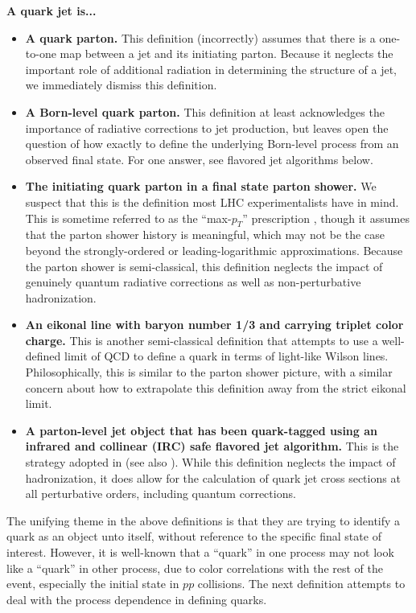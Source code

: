 \documentclass[11pt]{cernrep}
\begin{document}
\noindent \textbf{A quark jet is...}
\begin{itemize}
\item \textbf{A quark parton.}  This definition (incorrectly) assumes that there is a one-to-one map between a jet and its initiating parton.  Because it neglects the important role of additional radiation in determining the structure of a jet, we immediately dismiss this definition.
\item \textbf{A Born-level quark parton.}  This definition at least acknowledges the importance of radiative corrections to jet production, but leaves open the question of how exactly to define the underlying Born-level process from an observed final state.  For one answer, see flavored jet algorithms below.
\item \textbf{The initiating quark parton in a final state parton shower.}  We suspect that this is the definition most LHC experimentalists have in mind.  This is sometime referred to as the ``max-$p_T$'' prescription \cite{}, though it assumes that the parton shower history is meaningful, which may not be the case beyond the strongly-ordered or leading-logarithmic approximations.  Because the parton shower is semi-classical, this definition neglects the impact of genuinely quantum radiative corrections as well as non-perturbative hadronization. 
\item \textbf{An eikonal line with baryon number 1/3 and carrying triplet color charge.}  This is another semi-classical definition that attempts to use a well-defined limit of QCD to define a quark in terms of light-like Wilson lines.  Philosophically, this is similar to the parton shower picture, with a similar concern about how to extrapolate this definition away from the strict eikonal limit.
\item \textbf{A parton-level jet object that has been quark-tagged using an infrared and collinear (IRC) safe flavored jet algorithm.}  This is the strategy adopted in \cite{} (see also \cite{}).  While this definition neglects the impact of hadronization, it does allow for the calculation of quark jet cross sections at all perturbative orders, including quantum corrections.
\end{itemize}
The unifying theme in the above definitions is that they are trying to identify a quark as an object unto itself, without reference to the specific final state of interest.  However, it is well-known that a ``quark'' in one process may not look like a ``quark'' in other process, due to color correlations with the rest of the event, especially the initial state in $pp$ collisions.  The next definition attempts to deal with the process dependence in defining quarks. 
\end{document}
